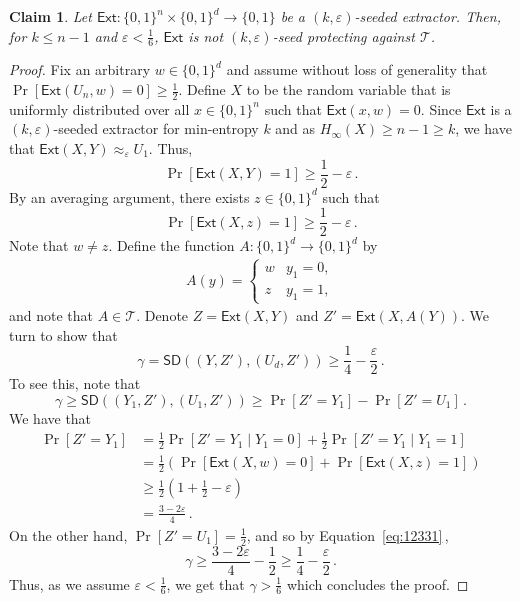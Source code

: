 \documentclass[11pt]{article}
\numberwithin{equation}{section}
\newtheorem{claim}[theorem]{Claim}
\theoremstyle{definition}
\theoremstyle{plain}
\newcommand{\ext}{\mathsf{Ext}}
\newcommand{\adv}{A}
\newcommand{\advpair}{\mathcal{T}}
\newcommand{\eps}{\varepsilon}
\newcommand{\me}{{H_{\infty}}}
\def\SD{\ensuremath{\mathsf{SD}}}
\begin{document}
\begin{claim}\label{c:lower bound image two intro}
	Let $\ext \colon \{0,1\}^n \times \{0,1\}^d \to \{0,1\}$ be a $(k,\eps)$-seeded extractor. Then, for $k \le n-1$ and $\eps < \frac1{6}$, $\ext$ is not $(k,\eps)$-seed protecting against $\advpair$.
\end{claim}
\begin{proof}
	Fix an arbitrary $w \in \{0,1\}^d$ and assume without loss of generality that $\Pr[\ext(U_n,w) = 0] \ge \frac1{2}$. Define $X$ to be the random variable that is uniformly distributed over all $x \in \{0,1\}^n$ such that $\ext(x,w ) = 0$. Since $\ext$ is a 
%
$(k,\eps)$-seeded extractor   %
for min-entropy $k$ and as $\me(X) \ge n-1 \ge k$, we have that $\ext(X,Y) \approx_\eps U_1$. Thus,
	$$
	\Pr[\ext(X,Y) = 1] \ge \frac1{2} - \eps\,.
	$$
	By an averaging argument, there exists $z \in \{0,1\}^d$ such that
	$$
	\Pr[\ext(X,z) = 1] \ge \frac1{2} - \eps\,.
	$$
	Note that $w \neq z$. Define the function $\adv : \{0,1\}^d \to \{0,1\}^d$ by
	\begin{align*}
	\adv(y) = \begin{cases}
	w & y_1 = 0,\\
	z & y_1 = 1,
	\end{cases}
	\end{align*}
	and note that $\adv \in \advpair$. Denote $Z = \ext(X,Y)$ and $Z' = \ext(X,A(Y))$.	We turn to show that
	$$
	\gamma = \SD\left(\left(Y,Z'\right) , \left(U_d, Z'\right)\right) \ge \frac1{4} - \frac{\eps}{2}\,.
	$$
	To see this, note that
	\begin{equation}\label{eq:12331}
	\gamma \ge \SD\left(\left(Y_1, Z'\right) , \left(U_1,Z'\right)\right)
	\ge \Pr[Z' = Y_1] - \Pr[Z' = U_1]\,.
	\end{equation}
	We have that
	\begin{align*}
	\Pr[Z' = Y_1] &=
	\frac1{2} \Pr[Z' = Y_1 \mid Y_1 = 0] + \frac1{2} \Pr[Z' = Y_1 \mid Y_1 = 1] \\
	&= \frac1{2} \left(\Pr[\ext(X,w) = 0] + \Pr[\ext(X,z) = 1] \right) \\
	&\ge \frac1{2} \left(1 + \frac1{2} - \eps\right) \\
	&= \frac{3-2\eps}{4}\,.
	\end{align*}
	On the other hand, $\Pr[Z' = U_1] = \frac1{2}$, and so by Equation~\eqref{eq:12331}\,, $$
	\gamma \ge \frac{3-2\eps}{4} - \frac1{2} \ge \frac1{4} - \frac{\eps}{2}\,.
	$$
	Thus, as we assume $\eps < \frac1{6}$, we get that
	$\gamma > \frac1{6}$ which concludes the proof.
\end{proof}
\end{document}
